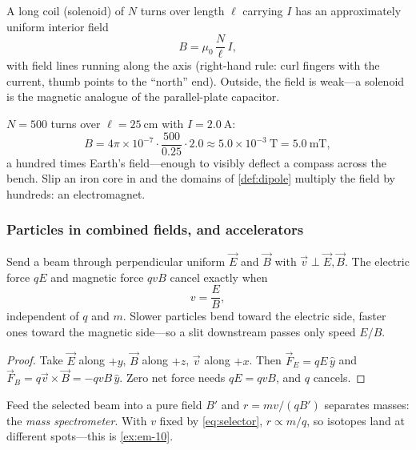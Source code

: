 \begin{theorem}[Solenoid]\label{thm:solenoid}
A long coil (solenoid) of $N$ turns over length $\ell$ carrying $I$ has an approximately uniform interior field
\begin{equation}\label{eq:solenoid}
  B = \mu_0\,\frac{N}{\ell}\,I,
\end{equation}
with field lines running along the axis (right-hand rule: curl fingers with the current, thumb points to the ``north'' end). Outside, the field is weak---a solenoid is the magnetic analogue of the parallel-plate capacitor.
\end{theorem}

\begin{example}\label{exm:solenoid}
$N = 500$ turns over $\ell = 25\ \mathrm{cm}$ with $I = 2.0\ \mathrm{A}$:
\[
  B = 4\pi\times 10^{-7}\cdot\frac{500}{0.25}\cdot 2.0 \approx 5.0\times 10^{-3}\ \mathrm{T} = 5.0\ \mathrm{mT},
\]
a hundred times Earth's field---enough to visibly deflect a compass across the bench. Slip an iron core in and the domains of \cref{def:dipole} multiply the field by hundreds: an electromagnet.
\end{example}

\subsubsection{Particles in combined fields, and accelerators}

\begin{proposition}\label{prop:selector}
Send a beam through perpendicular uniform $\vec{E}$ and $\vec{B}$ with $\vec{v}\perp\vec{E},\vec{B}$. The electric force $qE$ and magnetic force $qvB$ cancel exactly when
\begin{equation}\label{eq:selector}
  v = \frac{E}{B},
\end{equation}
independent of $q$ and $m$. Slower particles bend toward the electric side, faster ones toward the magnetic side---so a slit downstream passes only speed $E/B$.
\end{proposition}

\begin{proof}
Take $\vec{E}$ along $+y$, $\vec{B}$ along $+z$, $\vec{v}$ along $+x$. Then $\vec{F}_E = qE\,\hat{y}$ and $\vec{F}_B = q\vec{v}\times\vec{B} = -qvB\,\hat{y}$. Zero net force needs $qE = qvB$, and $q$ cancels. \qedhere
\end{proof}

Feed the selected beam into a pure field $B'$ and $r = mv/(qB')$ separates masses: the \emph{mass spectrometer}. With $v$ fixed by \cref{eq:selector}, $r\propto m/q$, so isotopes land at different spots---this is \cref{ex:em-10}.

